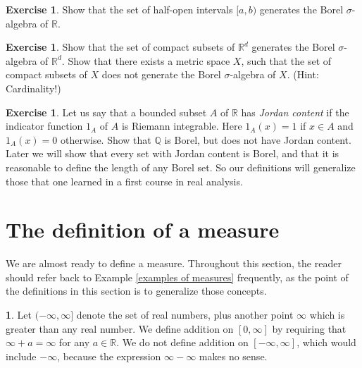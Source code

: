 \documentclass[12pt]{book}
\newcommand{\QQ}{\mathbb{Q}}
\newcommand{\RR}{\mathbb{R}}
\newcommand{\dfn}[1]{\emph{#1}\index{#1}}
\theoremstyle{definition}
\newtheorem{subsec}[theorem]{}
\newtheorem{definition}[theorem]{Definition}
\newtheorem{exercise}[theorem]{Exercise}
\begin{document}
\begin{exercise}
Show that the set of half-open intervals $[a, b)$ generates the Borel $\sigma$-algebra of $\RR$.
\end{exercise}

\begin{exercise}
Show that the set of compact subsets of $\RR^d$ generates the Borel $\sigma$-algebra of $\RR^d$.
Show that there exists a metric space $X$, such that the set of compact subsets of $X$ does not generate the Borel $\sigma$-algebra of $X$. (Hint: Cardinality!)
\end{exercise}

\begin{exercise}
\label{Jordan content 1}
Let us say that a bounded subset $A$ of $\RR$ has \dfn{Jordan content} if the indicator function $1_A$ of $A$ is Riemann integrable.
Here $1_A(x) = 1$ if $x \in A$ and $1_A(x) = 0$ otherwise.
Show that $\QQ$ is Borel, but does not have Jordan content.
Later we will show that every set with Jordan content is Borel, and that it is reasonable to define the length of any Borel set.
So our definitions will generalize those that one learned in a first course in real analysis.
\end{exercise}


\section{The definition of a measure}
We are almost ready to define a measure.
Throughout this section, the reader should refer back to Example \ref{examples of measures} frequently, as the point of the definitions in this section is to generalize those concepts.

\begin{subsec}
Let $(-\infty, \infty]$ denote the set of real numbers, plus another point $\infty$ which is greater than any real number.
We define addition on $[0, \infty]$ by requiring that $\infty + a = \infty$ for any $a \in \RR$.
We do not define addition on $[-\infty, \infty]$, which would include $-\infty$, because the expression $\infty - \infty$ makes no sense.
\end{subsec}

\end{document}
